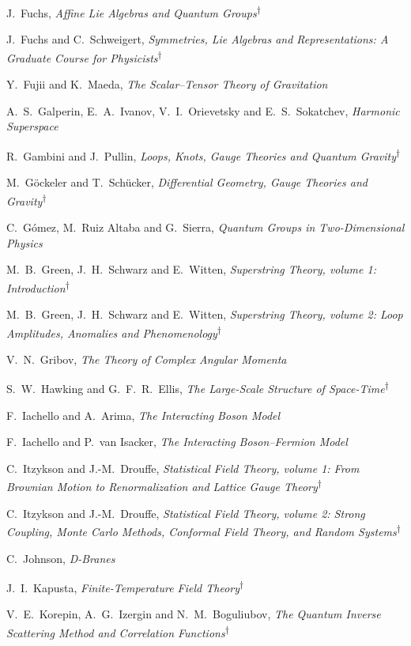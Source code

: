 \begin{list}{}{\setlength{\leftmargin}{0pt}\setlength{\rightmargin}{0pt}
\setlength{\itemsep}{2pt}\setlength{\parsep}{0pt}}
\item J.~Fuchs, \emph{Affine Lie Algebras and Quantum Groups}\textsuperscript{\(\dagger\)}
\item J.~Fuchs and C.~Schweigert, \emph{Symmetries, Lie Algebras and Representations: A Graduate Course for Physicists}\textsuperscript{\(\dagger\)}
\item Y.~Fujii and K.~Maeda, \emph{The Scalar--Tensor Theory of Gravitation}
\item A.~S.~Galperin, E.~A.~Ivanov, V.~I.~Orievetsky and E.~S.~Sokatchev, \emph{Harmonic Superspace}
\item R.~Gambini and J.~Pullin, \emph{Loops, Knots, Gauge Theories and Quantum Gravity}\textsuperscript{\(\dagger\)}
\item M.~Göckeler and T.~Schücker, \emph{Differential Geometry, Gauge Theories and Gravity}\textsuperscript{\(\dagger\)}
\item C.~Gómez, M.~Ruiz Altaba and G.~Sierra, \emph{Quantum Groups in Two-Dimensional Physics}
\item M.~B.~Green, J.~H.~Schwarz and E.~Witten, \emph{Superstring Theory, volume 1: Introduction}\textsuperscript{\(\dagger\)}
\item M.~B.~Green, J.~H.~Schwarz and E.~Witten, \emph{Superstring Theory, volume 2: Loop Amplitudes, Anomalies and Phenomenology}\textsuperscript{\(\dagger\)}
\item V.~N.~Gribov, \emph{The Theory of Complex Angular Momenta}
\item S.~W.~Hawking and G.~F.~R.~Ellis, \emph{The Large-Scale Structure of Space-Time}\textsuperscript{\(\dagger\)}
\item F.~Iachello and A.~Arima, \emph{The Interacting Boson Model}
\item F.~Iachello and P.~van Isacker, \emph{The Interacting Boson--Fermion Model}
\item C.~Itzykson and J.-M.~Drouffe, \emph{Statistical Field Theory, volume 1: From Brownian Motion to Renormalization and Lattice Gauge Theory}\textsuperscript{\(\dagger\)}
\item C.~Itzykson and J.-M.~Drouffe, \emph{Statistical Field Theory, volume 2: Strong Coupling, Monte Carlo Methods, Conformal Field Theory, and Random Systems}\textsuperscript{\(\dagger\)}
\item C.~Johnson, \emph{D-Branes}
\item J.~I.~Kapusta, \emph{Finite-Temperature Field Theory}\textsuperscript{\(\dagger\)}
\item V.~E.~Korepin, A.~G.~Izergin and N.~M.~Boguliubov, \emph{The Quantum Inverse Scattering Method and Correlation Functions}\textsuperscript{\(\dagger\)}

\end{list}

